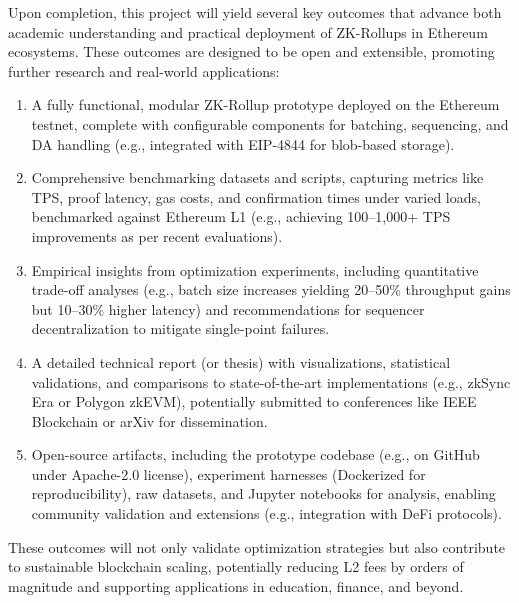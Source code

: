 Upon completion, this project will yield several key outcomes that advance both academic understanding and practical deployment of ZK-Rollups in Ethereum ecosystems. These outcomes are designed to be open and extensible, promoting further research and real-world applications:
\begin{enumerate}
    \item A fully functional, modular ZK-Rollup prototype deployed on the Ethereum testnet, complete with configurable components for batching, sequencing, and DA handling (e.g., integrated with EIP-4844 for blob-based storage).
    \item Comprehensive benchmarking datasets and scripts, capturing metrics like TPS, proof latency, gas costs, and confirmation times under varied loads, benchmarked against Ethereum L1 (e.g., achieving 100--1,000+ TPS improvements as per recent evaluations).
    \item Empirical insights from optimization experiments, including quantitative trade-off analyses (e.g., batch size increases yielding 20--50\% throughput gains but 10--30\% higher latency) and recommendations for sequencer decentralization to mitigate single-point failures.
    \item A detailed technical report (or thesis) with visualizations, statistical validations, and comparisons to state-of-the-art implementations (e.g., zkSync Era or Polygon zkEVM), potentially submitted to conferences like IEEE Blockchain or arXiv for dissemination.
    \item Open-source artifacts, including the prototype codebase (e.g., on GitHub under Apache-2.0 license), experiment harnesses (Dockerized for reproducibility), raw datasets, and Jupyter notebooks for analysis, enabling community validation and extensions (e.g., integration with DeFi protocols).
\end{enumerate}
These outcomes will not only validate optimization strategies but also contribute to sustainable blockchain scaling, potentially reducing L2 fees by orders of magnitude and supporting applications in education, finance, and beyond.